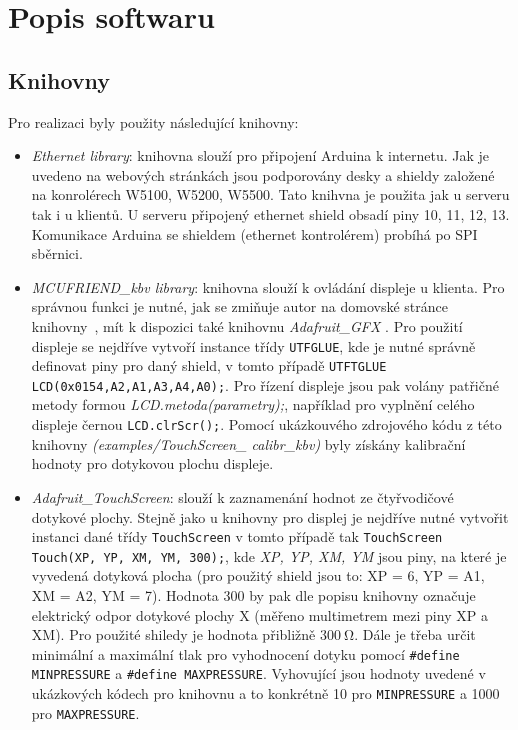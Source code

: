 \section{Popis softwaru}
\subsection{Knihovny}
\label{sec:knihovny}
Pro realizaci byly použity následující knihovny:
\begin{itemize}
  \item \textit{Ethernet library}: knihovna slouží pro připojení Arduina k internetu. Jak je uvedeno na webových stránkách \cite{EthLib} jsou podporovány desky a shieldy založené na konrolérech W5100, W5200, W5500. Tato knihvna je použita jak u serveru tak i u klientů. U serveru připojený ethernet shield obsadí piny 10, 11, 12, 13. Komunikace Arduina se shieldem (ethernet kontrolérem) probíhá po SPI sběrnici.

  \item \textit{MCUFRIEND\_kbv library}: knihovna slouží k ovládání displeje u klienta. Pro správnou funkci je nutné, jak se zmiňuje autor na domovské stránce knihovny~\cite{lib_MCUFRIEND_kbv},  mít k dispozici také knihovnu \textit{Adafruit\_GFX} \cite{lib_adafruitGFX}. Pro použití displeje se nejdříve vytvoří instance třídy \texttt{UTFGLUE}, kde je nutné správně definovat piny pro daný shield, v tomto případě \texttt{UTFTGLUE LCD(0x0154,A2,A1,A3,A4,A0);}. Pro řízení displeje jsou pak volány patřičné metody formou \textit{LCD.metoda(parametry);}, například pro vyplnění celého displeje černou \texttt{LCD.clrScr();}. Pomocí ukázkouvého zdrojového kódu z této knihovny \textit{(examples/TouchScreen\_
calibr\_kbv)} byly získány kalibrační hodnoty pro dotykovou plochu displeje.

  \item \textit{Adafruit\_TouchScreen}: slouží k zaznamenání hodnot ze čtyřvodičové dotykové plochy. Stejně jako u knihovny pro displej je nejdříve nutné vytvořit instanci dané třídy \texttt{TouchScreen} v tomto případě tak \texttt{TouchScreen Touch(XP, YP, XM, YM, 300);}, kde \textit{XP, YP, XM, YM} jsou piny, na které je vyvedená dotyková plocha (pro použitý shield jsou to: XP = 6, YP = A1, XM = A2, YM = 7). Hodnota 300 by pak dle popisu knihovny \cite{lib_touch} označuje elektrický odpor dotykové plochy X (měřeno multimetrem mezi piny XP a XM). Pro použité shiledy je hodnota přibližně $300  \ \mathrm{\Omega}$. Dále je třeba určit minimální a maximální tlak pro vyhodnocení dotyku pomocí \texttt{\#define MINPRESSURE} a \texttt{\#define MAXPRESSURE}. Vyhovující jsou hodnoty uvedené v ukázkových kódech pro knihovnu a to konkrétně 10 pro \texttt{MINPRESSURE} a 1000 pro \texttt{MAXPRESSURE}.


\end{itemize}
